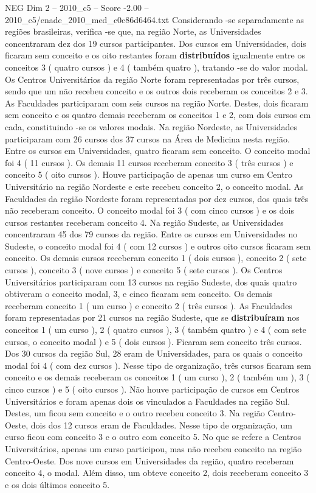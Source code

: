 \begin{textsample}{NEG Dim 2 – 2010\_c5 – Score -2.00 – 2010\_c5/enade\_2010\_med\_c0c86d6464.txt}
Considerando -se separadamente as regiões brasileiras, verifica -se que, na região Norte, as Universidades concentraram dez dos 19 cursos participantes.
Dos cursos em Universidades, dois ficaram sem conceito e os oito restantes foram \textbf{distribuídos} igualmente entre os conceitos 3 ( quatro cursos ) e 4 ( também quatro ), tratando -se do valor modal.
Os Centros Universitários da região Norte foram representadas por três cursos, sendo que um não recebeu conceito e os outros dois receberam os conceitos 2 e 3.
As Faculdades participaram com seis cursos na região Norte.
Destes, dois ficaram sem conceito e os quatro demais receberam os conceitos 1 e 2, com dois cursos em cada, constituindo -se os valores modais.
Na região Nordeste, as Universidades participaram com 26 cursos dos 37 cursos na Área de Medicina nesta região.
Entre os cursos em Universidades, quatro ficaram sem conceito.
O conceito modal foi 4 ( 11 cursos ).
Os demais 11 cursos receberam conceito 3 ( três cursos ) e conceito 5 ( oito cursos ).
Houve participação de apenas um curso em Centro Universitário na região Nordeste e este recebeu conceito 2, o conceito modal.
As Faculdades da região Nordeste foram representadas por dez cursos, dos quais três não receberam conceito.
O conceito modal foi 3 ( com cinco cursos ) e os dois cursos restantes receberam conceito 4.
Na região Sudeste, as Universidades concentraram 45 dos 79 cursos da região.
Entre os cursos em Universidades no Sudeste, o conceito modal foi 4 ( com 12 cursos ) e outros oito cursos ficaram sem conceito.
Os demais cursos receberam conceito 1 ( dois cursos ), conceito 2 ( sete cursos ), conceito 3 ( nove cursos ) e conceito 5 ( sete cursos ).
Os Centros Universitários participaram com 13 cursos na região Sudeste, dos quais quatro obtiveram o conceito modal, 3, e cinco ficaram sem conceito.
Os demais receberam conceito 1 ( um curso ) e conceito 2 ( três cursos ).
As Faculdades foram representadas por 21 cursos na região Sudeste, que se \textbf{distribuíram} nos conceitos 1 ( um curso ), 2 ( quatro cursos ), 3 ( também quatro ) e 4 ( com sete cursos, o conceito modal ) e 5 ( dois cursos ).
Ficaram sem conceito três cursos.
Dos 30 cursos da região Sul, 28 eram de Universidades, para os quais o conceito modal foi 4 ( com dez cursos ).
Nesse tipo de organização, três cursos ficaram sem conceito e os demais receberam os conceitos 1 ( um curso ), 2 ( também um ), 3 ( cinco cursos ) e 5 ( oito cursos ).
Não houve participação de cursos em Centros Universitários e foram apenas dois os vinculados a Faculdades na região Sul.
Destes, um ficou sem conceito e o outro recebeu conceito 3.
Na região Centro-Oeste, dois dos 12 cursos eram de Faculdades.
Nesse tipo de organização, um curso ficou com conceito 3 e o outro com conceito 5.
No que se refere a Centros Universitários, apenas um curso participou, mas não recebeu conceito na região Centro-Oeste.
Dos nove cursos em Universidades da região, quatro receberam conceito 4, o modal.
Além disso, um obteve conceito 2, dois receberam conceito 3 e os dois últimos conceito 5.

\end{textsample}
